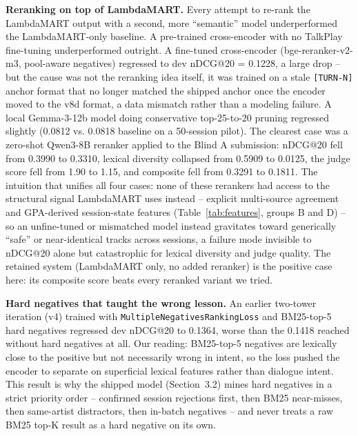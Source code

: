 \documentclass[sigconf]{acmart}
\begin{document}
\textbf{Reranking on top of LambdaMART.} Every attempt to re-rank the
LambdaMART output with a second, more ``semantic'' model underperformed the
LambdaMART-only baseline. A pre-trained
cross-encoder with no TalkPlay fine-tuning underperformed outright. A
fine-tuned cross-encoder (bge-reranker-v2-m3, pool-aware negatives) regressed
to dev nDCG@20 = 0.1228, a large drop -- but the cause was not the reranking
idea itself, it was trained on a stale \texttt{[TURN-N]} anchor format that no
longer matched the shipped anchor once the encoder moved to the v8d format, a
data mismatch rather than a modeling failure. A local Gemma-3-12b model doing
conservative top-25-to-20 pruning regressed slightly (0.0812 vs. 0.0818
baseline on a 50-session pilot). The clearest case was a zero-shot Qwen3-8B
reranker applied to the Blind A submission: nDCG@20 fell from 0.3990 to
0.3310, lexical diversity collapsed from 0.5909 to 0.0125, the judge score
fell from 1.90 to 1.15, and composite fell from 0.3291 to 0.1811. The
intuition that unifies all four cases: none of these rerankers had access to
the structural signal LambdaMART uses instead -- explicit multi-source
agreement and GPA-derived session-state features (Table~\ref{tab:features},
groups B and D) -- so an unfine-tuned or mismatched model instead gravitates
toward generically ``safe'' or near-identical tracks across sessions, a
failure mode invisible to nDCG@20 alone but catastrophic for lexical
diversity and judge quality. The retained system (LambdaMART only, no added
reranker) is the positive case here: its composite score beats every
reranked variant we tried.

\textbf{Hard negatives that taught the wrong lesson.} An earlier two-tower
iteration (v4) trained with \texttt{MultipleNegativesRankingLoss} and
BM25-top-5 hard negatives regressed dev nDCG@20 to 0.1364, worse than the
0.1418 reached without hard negatives at all. Our reading: BM25-top-5
negatives are lexically close to the positive but not necessarily wrong in
intent, so the loss pushed the encoder to separate on superficial lexical
features rather than dialogue intent. This result is why the shipped model
(Section~3.2) mines hard negatives in a strict priority order -- confirmed
session rejections first, then BM25 near-misses, then same-artist
distractors, then in-batch negatives -- and never treats a raw BM25 top-K
result as a hard negative on its own.
\end{document}
